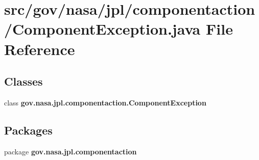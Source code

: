 \section{src/gov/nasa/jpl/componentaction/\+Component\+Exception.java File Reference}
\label{_component_exception_8java}
\subsection*{Classes}
\begin{DoxyCompactItemize}
\item 
class {\bf gov.\+nasa.\+jpl.\+componentaction.\+Component\+Exception}
\end{DoxyCompactItemize}
\subsection*{Packages}
\begin{DoxyCompactItemize}
\item 
package {\bf gov.\+nasa.\+jpl.\+componentaction}
\end{DoxyCompactItemize}
